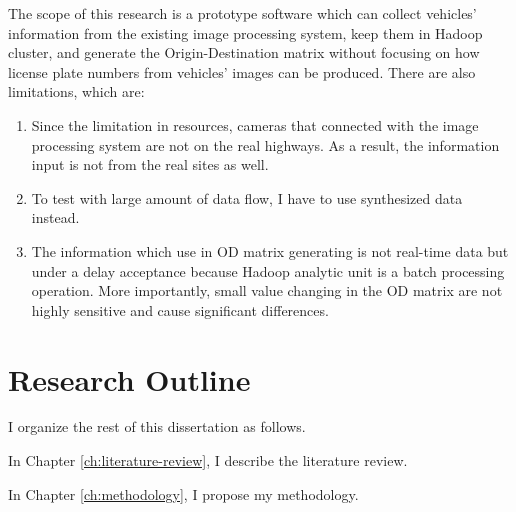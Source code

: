 The scope of this research is a prototype software which can collect vehicles' information from the existing image processing system, keep them in Hadoop cluster, and generate the Origin-Destination matrix without focusing on how license plate numbers from vehicles' images can be produced. There are also limitations, which are:

\begin{enumerate}
    \item Since the limitation in resources, cameras that connected with the image processing system are not on the real highways. As a result, the information input is not from the real sites as well.
    \item To test with large amount of data flow, I have to use synthesized data instead.
    \item The information which use in OD matrix generating is not real-time data but under a delay acceptance because Hadoop analytic unit is a batch processing operation. More importantly, small value changing in the OD matrix are not highly sensitive and cause significant differences.
\end{enumerate}

\section{Research Outline}

I organize the rest of this dissertation as follows.

In Chapter \ref{ch:literature-review}, I describe the literature review.

In Chapter \ref{ch:methodology}, I propose my methodology.



\FloatBarrier

